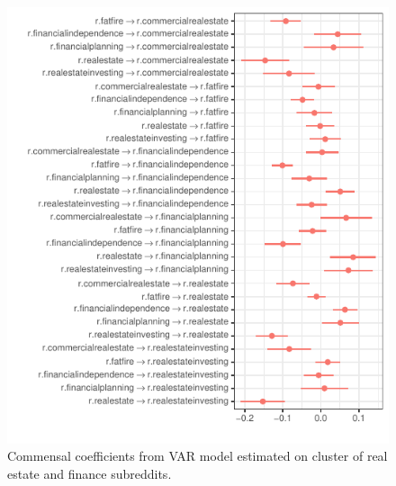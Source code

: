 \documentclass[manuscript]{acmart}\usepackage[]{graphicx}\usepackage[]{color}
\makeatletter
\def\maxwidth{ %
  \ifdim\Gin@nat@width>\linewidth
    \linewidth
  \else
    \Gin@nat@width
  \fi
}
\makeatother
\begin{document}
\begin{figure}[h]
\centering

\includegraphics[width=\maxwidth]{figures/knitr-comp_coefs-1} 

\caption{Commensal coefficients from VAR model estimated on cluster of real estate and finance subreddits. \label{comp.coefs}}
\end{figure}
\end{document}
